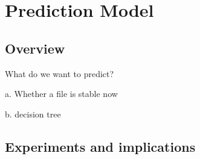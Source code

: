 \section{Prediction Model}

\subsection{Overview}

What do we want to predict?

a. Whether a file is stable now

b. decision tree

\subsection{Experiments and implications}


